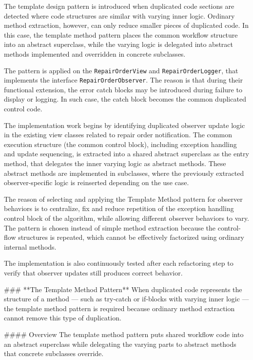 \documentclass[a4paper]{scrartcl}
\begin{document}

The template design pattern is introduced when duplicated code sections are detected where code structures are similar with varying inner logic. Ordinary method extraction, however, can only reduce smaller pieces of duplicated code. In this case, the template method pattern places the common workflow structure into an abstract superclass, while the varying logic is delegated into abstract methods implemented and overridden in concrete subclasses.

The pattern is applied on the \texttt{RepairOrderView} and \texttt{RepairOrderLogger}, that implements the interface \texttt{RepairOrderObserver}. The reason is that during their functional extension, the error catch blocks may be introduced during failure to display or logging. In such case, the catch block becomes the common duplicated control code.

The implementation work begins by identifying duplicated observer update logic in the existing view classes related to repair order notification. The common execution structure (the common control block), including exception handling and update sequencing, is extracted into a shared abstract superclass as the entry method, that delegates the inner varying logic as abstract methods. These abstract methods are implemented in subclasses, where the previously extracted observer-specific logic is reinserted depending on the use case.

The reason of selecting and applying the Template Method pattern for observer behaviors is to centralize, fix and reduce repetition of the exception handling control block of the algorithm, while allowing different observer behaviors to vary. The pattern is chosen instead of simple method extraction because the control-flow structures is repeated, which cannot be effectively factorized using ordinary internal methods. 

The implementation is also continuously tested after each refactoring step to verify that observer updates still produces correct behavior.

\iffalse
### **The Template Method Pattern**
When duplicated code represents the structure of a method — such as try‑catch or if‑blocks with varying inner logic — the template method pattern is required because ordinary method extraction cannot remove this type of duplication.

#### Overview
The template method pattern puts shared workflow code into an abstract superclass while delegating the varying parts to abstract methods that concrete subclasses override.
\end{document}
